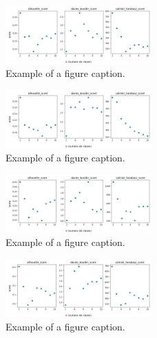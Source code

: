 \begin{figure}[htbp]
\centerline{\includegraphics[width=0.5\textwidth]{graficos_experimentos/gmm/caracteristicos3_pca0.95.png}}
\caption{Example of a figure caption.}
\label{graficos_experimentos/gmm/caracteristicos3_pca0.95.png}
\end{figure}
 
\begin{figure}[htbp]
\centerline{\includegraphics[width=0.5\textwidth]{graficos_experimentos/gmm/caracteristicos3_pca0.99.png}}
\caption{Example of a figure caption.}
\label{graficos_experimentos/gmm/caracteristicos3_pca0.99.png}
\end{figure}
 
\begin{figure}[htbp]
\centerline{\includegraphics[width=0.5\textwidth]{graficos_experimentos/gmm/caracteristicos4_pca0.9.png}}
\caption{Example of a figure caption.}
\label{graficos_experimentos/gmm/caracteristicos4_pca0.9.png}
\end{figure}
 
\begin{figure}[htbp]
\centerline{\includegraphics[width=0.5\textwidth]{graficos_experimentos/gmm/caracteristicos4_pca0.95.png}}
\caption{Example of a figure caption.}
\label{graficos_experimentos/gmm/caracteristicos4_pca0.95.png}
\end{figure}
 
